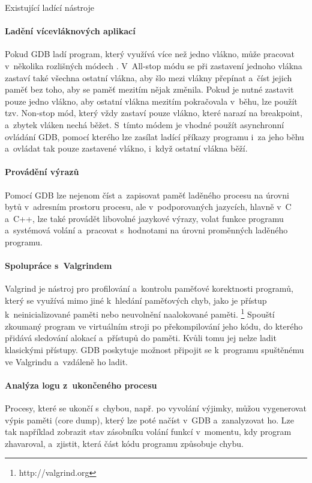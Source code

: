 \documentclass[czech,bachelor,male,python,dept460,hidelinks]{diploma}						%
\begin{document}
\begin{section}{Existující ladící nástroje}
		\paragraph*{Ladění vícevláknových aplikací}
			Pokud GDB ladí program, který využívá více než jedno vlákno, může pracovat v~několika rozlišných módech \cite{gdb-multithreading}.
			V~All-stop módu se při zastavení jednoho vlákna zastaví také všechna ostatní vlákna, aby šlo mezi vlákny přepínat a~číst jejich paměť bez toho,
			aby se paměť mezitím nějak změnila. Pokud je nutné zastavit pouze jedno vlákno, aby ostatní vlákna mezitím pokračovala v~běhu, lze použít tzv. Non-stop mód,
			který vždy zastaví pouze vlákno, které narazí na breakpoint, a~zbytek vláken nechá běžet. S~tímto módem je vhodné použít asynchronní ovládání GDB,
			pomocí kterého lze zasílat ladící příkazy programu i~za jeho běhu a~ovládat tak pouze zastavené vlákno, i~když ostatní vlákna běží.
		\paragraph*{Provádění výrazů}
			Pomocí GDB lze nejenom číst a~zapisovat paměť laděného procesu na úrovni bytů v~adresním prostoru procesu, ale v~podporovaných jazycích, hlavně
			v~C a~C++, lze také provádět libovolné jazykové výrazy, volat funkce programu a~systémová volání a~pracovat s~hodnotami na úrovni proměnných
			laděného programu.
		\paragraph*{Spolupráce s~Valgrindem}
			Valgrind je nástroj pro profilování a~kontrolu paměťové korektnosti programů, který se využívá mimo jiné k~hledání paměťových chyb, jako je přístup
			k~neinicializované paměti nebo neuvolnění naalokované paměti. \footnote{http://valgrind.org}
			Spouští zkoumaný program ve virtuálním stroji po překompilování jeho kódu, do kterého přidává sledování alokací a~přístupů do paměti.
			Kvůli tomu jej nelze ladit klasickými přístupy. GDB poskytuje možnost připojit se k~programu spuštěnému ve Valgrindu a~vzdáleně ho ladit.
		\paragraph*{Analýza logu z~ukončeného procesu}
			Procesy, které se ukončí s~chybou, např. po vyvolání výjimky, můžou vygenerovat výpis paměti (core dump), který lze poté načíst v~GDB a~zanalyzovat ho.
			Lze tak například zobrazit stav zásobníku volání funkcí v~momentu, kdy program zhavaroval, a~zjistit, která část kódu programu způsobuje chybu.

\end{section}
\end{document}
